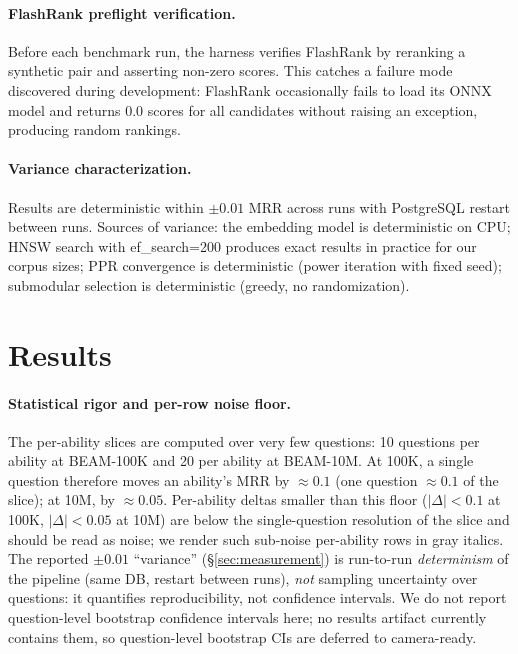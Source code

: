 \documentclass[11pt]{article}
\begin{document}
\paragraph{FlashRank preflight verification.}
Before each benchmark run, the harness verifies FlashRank by reranking
a synthetic pair and asserting non-zero scores.  This catches a
failure mode discovered during development: FlashRank occasionally
fails to load its ONNX model and returns 0.0 scores for all
candidates without raising an exception, producing random rankings.

\paragraph{Variance characterization.}
Results are deterministic within $\pm 0.01$ MRR across runs with
PostgreSQL restart between runs.  Sources of variance: the embedding
model is deterministic on CPU; HNSW search with ef\_search=200
produces exact results in practice for our corpus sizes; PPR
convergence is deterministic (power iteration with fixed seed);
submodular selection is deterministic (greedy, no randomization).

\section{Results}
\label{sec:results}

\paragraph{Statistical rigor and per-row noise floor.}
The per-ability slices are computed over very few questions: 10
questions per ability at BEAM-100K and 20 per ability at BEAM-10M.
At 100K, a single question therefore moves an ability's MRR by
$\approx 0.1$ (one question $\approx 0.1$ of the slice); at 10M, by
$\approx 0.05$.  Per-ability deltas smaller than this floor
($|\Delta| < 0.1$ at 100K, $|\Delta| < 0.05$ at 10M) are below the
single-question resolution of the slice and should be read as noise;
we render such sub-noise per-ability rows in gray italics.  The
reported $\pm 0.01$ ``variance'' (\S\ref{sec:measurement}) is
run-to-run \emph{determinism} of the pipeline (same DB, restart
between runs), \emph{not} sampling uncertainty over questions: it
quantifies reproducibility, not confidence intervals.  We do not
report question-level bootstrap confidence intervals here; no results
artifact currently contains them, so question-level bootstrap CIs are
deferred to camera-ready.
\end{document}
